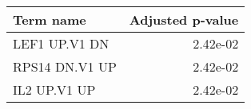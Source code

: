 \begin{tabular}{lr}
\toprule
     Term name &  Adjusted p-value \\
\midrule
 LEF1 UP.V1 DN &          2.42e-02 \\
RPS14 DN.V1 UP &          2.42e-02 \\
  IL2 UP.V1 UP &          2.42e-02 \\
\bottomrule
\end{tabular}
